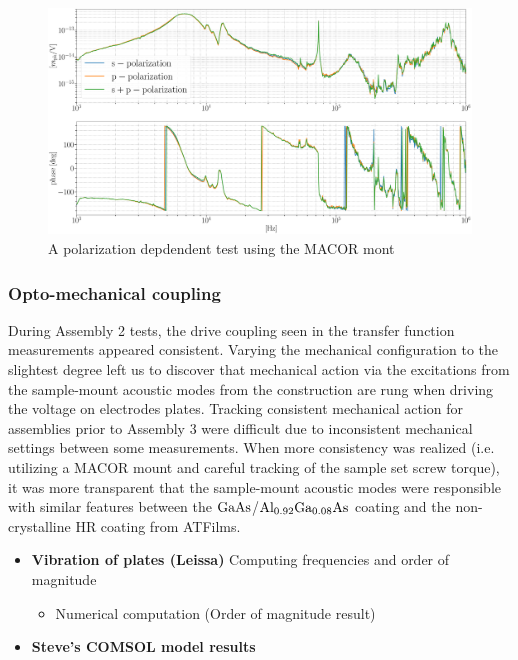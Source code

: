 \begin{figure}[H]
    \includegraphics[width=\textwidth]{figs/ALGAAS/results_figs/assembly3/petgmsvv64.pdf}
    \caption{A polarization depdendent test using the MACOR mont}
    \label{fig:measurement_sum}
\end{figure}

\subsubsection{Opto-mechanical coupling}
During Assembly 2 tests, the drive coupling seen in the transfer function measurements appeared consistent. Varying the mechanical configuration to the slightest degree left us to discover that mechanical action via the excitations from the sample-mount acoustic modes from the construction are rung when driving the voltage on electrodes plates. Tracking consistent mechanical action for assemblies prior to Assembly 3 were difficult due to inconsistent mechanical settings between some measurements. When more consistency was realized (i.e. utilizing a MACOR mount and careful tracking of the sample set screw torque), it was more transparent that the sample-mount acoustic modes were responsible with similar features between the $\mathrm{GaAs}$/$\mathrm{Al_{0.92}Ga_{0.08}As}$ coating and the non-crystalline HR coating from ATFilms.

\begin{itemize}
\item \textbf{Vibration of plates (Leissa)} \cite{leissa} Computing frequencies and order of magnitude
	\begin{itemize}
	    \item Numerical computation (Order of magnitude result)
	\end{itemize}
\item \textbf{Steve's COMSOL model results}
\end{itemize}

